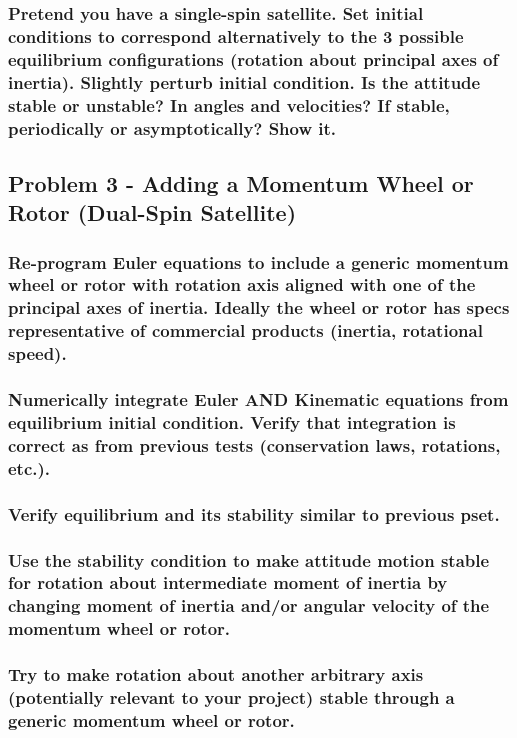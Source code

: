 \subsubsection{Pretend you have a single-spin satellite. Set initial conditions to correspond alternatively to the 3
possible equilibrium configurations (rotation about principal axes of inertia). Slightly perturb initial
condition. Is the attitude stable or unstable? In angles and velocities? If stable, periodically or
asymptotically? Show it.}

\subsection{Problem 3 - Adding a Momentum Wheel or Rotor (Dual-Spin Satellite)}

\subsubsection{Re-program Euler equations to include a generic momentum wheel or rotor with rotation axis
aligned with one of the principal axes of inertia. Ideally the wheel or rotor has specs representative
of commercial products (inertia, rotational speed).}

\subsubsection{Numerically integrate Euler AND Kinematic equations from equilibrium initial condition. Verify
that integration is correct as from previous tests (conservation laws, rotations, etc.).}

\subsubsection{Verify equilibrium and its stability similar to previous pset.}

\subsubsection{Use the stability condition to make attitude motion stable for rotation about intermediate moment
of inertia by changing moment of inertia and/or angular velocity of the momentum wheel or rotor.}

\subsubsection{Try to make rotation about another arbitrary axis (potentially relevant to your project) stable
through a generic momentum wheel or rotor.}

